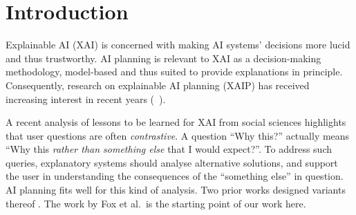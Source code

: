 \section{Introduction}
\label{introduction}

%
Explainable AI (XAI) is concerned with making AI systems' decisions
more lucid and thus trustworthy. AI planning is relevant to XAI as a
decision-making methodology, model-based and thus suited to provide
explanations in principle. Consequently, research on explainable AI
planning (XAIP) has received increasing interest in recent years
(\eg\ \cite{seegebarth:etal:icaps-12,smith:aaai-12,langley:etal:aaai-17,fox:etal:ijcai-ws-17,chakraborti:etal:ijcai-17,chakraborti:icaps-19}).

A recent analysis \cite{miller:ai-19} of lessons to be learned for XAI
from social sciences highlights that user questions are often
\emph{contrastive}. A question ``Why this?'' actually means ``Why this
\emph{rather than something else} that I would expect?''. To address
such queries, explanatory systems should analyse alternative
solutions, and support the user in understanding the consequences of
the ``something else'' in question.
%
AI planning fits well for this kind of analysis. Two prior works
designed variants thereof
\cite{fox:etal:ijcai-ws-17,miller:corr-18}. The work by Fox et al.\ is
the starting point of our work here.

